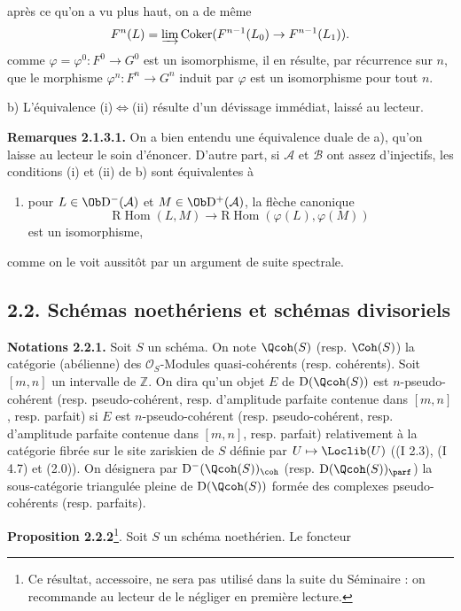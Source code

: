 après ce qu'on a vu plus haut, on a de même
\[
F^n(L)=\varinjlim\operatorname{Coker}(F^{n-1}(L_0)\to F^{n-1}(L_1)).
\]
comme $\varphi=\varphi^0:F^0\to G^0$ est un isomorphisme, il en résulte, par récurrence sur $n$, que le morphisme $\varphi^n:F^n\to G^n$ induit par $\varphi$ est un isomorphisme pour tout $n$.

b) L'équivalence (i)$\Leftrightarrow$(ii) résulte d'un dévissage immédiat, laissé au lecteur.

\textbf{Remarques 2.1.3.1.} On a bien entendu une équivalence duale de a), qu'on laisse au lecteur le soin d'énoncer. D'autre part, si $\mathcal A$ et $\mathcal B$ ont assez d'injectifs, les conditions (i) et (ii) de b) sont équivalentes à
\begin{enumerate}[label=(\roman*),start=3]
\item pour $L\in\Ob\mathrm D^{-}(\mathcal A)$ et $M\in\Ob\mathrm D^{+}(\mathcal A)$, la flèche canonique
\[
\mathrm R\!\operatorname{Hom}(L,M)\longrightarrow
\mathrm R\!\operatorname{Hom}(\varphi(L),\varphi(M))
\]
est un isomorphisme,
\end{enumerate}
comme on le voit aussitôt par un argument de suite spectrale.

\subsection*{2.2. Schémas noethériens et schémas divisoriels}

\textbf{Notations 2.2.1.} Soit $S$ un schéma. On note $\Qcoh(S)$ (resp. $\Coh(S)$) la catégorie (abélienne) des $\mathcal O_S$-Modules quasi-cohérents (resp. cohérents). Soit $[m,n]$ un intervalle de $\mathbb Z$. On dira qu'un objet $E$ de $\mathrm D(\Qcoh(S))$ est $n$-pseudo-cohérent (resp. pseudo-cohérent, resp. d'amplitude parfaite contenue dans $[m,n]$, resp. parfait) si $E$ est $n$-pseudo-cohérent (resp. pseudo-cohérent, resp. d'amplitude parfaite contenue dans $[m,n]$, resp. parfait) relativement à la catégorie fibrée sur le site zariskien de $S$ définie par $U\mapsto\Loclib(U)$ ((I 2.3), (I 4.7) et (2.0)). On désignera par $\mathrm D^{-}(\Qcoh(S))_{\coh}$ (resp. $\mathrm D(\Qcoh(S))_{\parf}$) la sous-catégorie triangulée pleine de $\mathrm D(\Qcoh(S))$ formée des complexes pseudo-cohérents (resp. parfaits).

\textbf{Proposition 2.2.2}\footnote{Ce résultat, accessoire, ne sera pas utilisé dans la suite du Séminaire : on recommande au lecteur de le négliger en première lecture.}. Soit $S$ un schéma noethérien. Le foncteur
